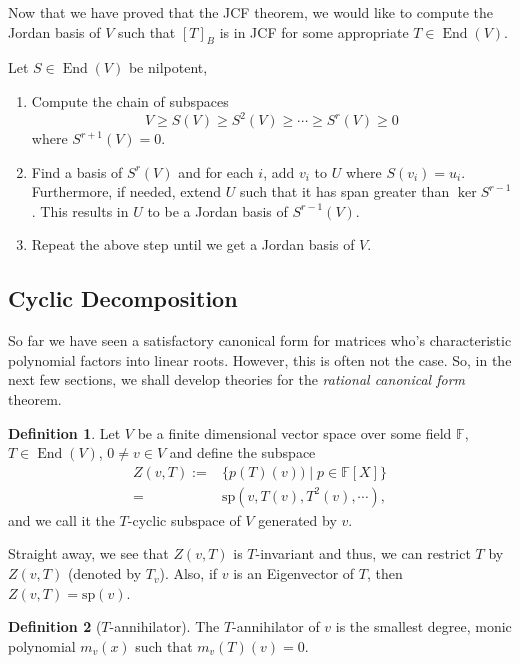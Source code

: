 \documentclass[
]{article}
\theoremstyle{definition}
\theoremstyle{definition}
\newtheorem{definition}{Definition}[section]
\begin{document}
Now that we have proved that the JCF theorem, we would like to compute
the Jordan basis of \(V\) such that \([T]_B\) is in JCF for some
appropriate \(T \in \mathop{\mathrm{End}}(V)\).

Let \(S \in \mathop{\mathrm{End}}(V)\) be nilpotent,

\begin{enumerate}
  \item Compute the chain of subspaces
    \[V \ge S(V) \ge S^2(V) \ge \cdots \ge S^r(V) \ge 0\]
    where \(S^{r + 1}(V) = 0\).
  \item Find a basis of \(S^r(V)\) and for each \(i\), add \(v_i\) to \(U\) where 
    \(S(v_i) = u_i\). Furthermore, if needed, extend \(U\) such that it has span 
    greater than \(\ker S^{r - 1}\). This results in \(U\) to be a Jordan basis of \(S^{r - 1}(V)\).
  \item Repeat the above step until we get a Jordan basis of \(V\).
\end{enumerate}

\hypertarget{cyclic-decomposition}{%
\subsection{Cyclic Decomposition}\label{cyclic-decomposition}}

So far we have seen a satisfactory canonical form for matrices who's
characteristic polynomial factors into linear roots. However, this is
often not the case. So, in the next few sections, we shall develop
theories for the \emph{rational canonical form} theorem.

\begin{definition}
  Let \(V\) be a finite dimensional vector space over some field \(\mathbb{F}\), 
  \(T \in \mathop{\mathrm{End}}(V)\), \(0 \neq v \in V\) and define the subspace
  \begin{align*}
    Z(v, T) := & \{p(T)(v)) \mid p \in \mathbb{F}[X]\} \\
      = & \text{sp}(v, T(v), T^2(v), \cdots),
  \end{align*}
  and we call it the  \(T\)-cyclic subspace of \(V\) generated by \(v\).
\end{definition}

Straight away, we see that \(Z(v, T)\) is \(T\)-invariant and thus, we
can restrict \(T\) by \(Z(v, T)\) (denoted by \(T_v\)). Also, if \(v\)
is an Eigenvector of \(T\), then \(Z(v, T) = \text{sp}(v)\).

\begin{definition}[\(T\)-annihilator]
  The \(T\)-annihilator of \(v\) is the smallest degree, monic polynomial \(m_v(x)\) 
  such that \(m_v(T)(v) = 0\).
\end{definition}
\end{document}
